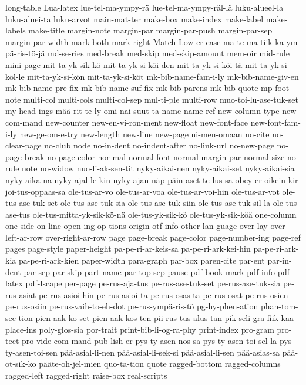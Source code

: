 {long-table
Lua-latex
lue-tel-ma-ympy-rä
lue-tel-ma-ympy-räl-lä
luku-alueel-la
luku-aluei-ta
luku-arvot
main-mat-ter
make-box
make-index
make-label
make-labels
make-title
margin-note
margin-par
margin-par-push
margin-par-sep
margin-par-width
mark-both
mark-right
Match-Low-er-case
ma-te-ma-tiik-ka-ym-pä-ris-tö-jä
md-se-ries
med-break
med-skip
med-skip-amount
mem-oir
mid-rule
mini-page
mit-ta-yk-sik-kö
mit-ta-yk-si-köi-den
mit-ta-yk-si-köi-tä
mit-ta-yk-si-köl-le
mit-ta-yk-si-kön
mit-ta-yk-si-köt
mk-bib-name-fam-i-ly
mk-bib-name-giv-en
mk-bib-name-pre-fix
mk-bib-name-suf-fix
mk-bib-parens
mk-bib-quote
mp-foot-note
multi-col
multi-cols
multi-col-sep
mul-ti-ple
multi-row
muo-toi-lu-ase-tuk-set
my-head-ings
mää-rit-te-ly-omi-nai-suut-ta
name
name-ref
new-column-type
new-com-mand
new-counter
new-en-vi-ron-ment
new-float
new-font-face
new-font-fam-i-ly
new-ge-om-e-try
new-length
new-line
new-page
ni-men-omaan
no-cite
no-clear-page
no-club
node
no-in-dent
no-indent-after
no-link-url
no-new-page
no-page-break
no-page-color
nor-mal
normal-font
normal-margin-par
normal-size
no-rule
note
no-widow
nuo-li-ak-sen-tit
nyky-aikai-nen
nyky-aikai-set
nyky-aikai-sia
nyky-aika-na
nyky-ajal-le-kin
nyky-ajan
näp-päin-aset-te-lus-sa
obey-cr
oikein-kir-joi-tus-oppaas-sa
ole-tus-ar-vo
ole-tus-ar-voa
ole-tus-ar-voi-hin
ole-tus-ar-vot
ole-tus-ase-tuk-set
ole-tus-ase-tuk-sia
ole-tus-ase-tuk-siin
ole-tus-ase-tuk-sil-la
ole-tus-ase-tus
ole-tus-mitta-yk-sik-kö-nä
ole-tus-yk-sik-kö
ole-tus-yk-sik-köä
one-column
one-side
on-line
open-ing
op-tions
origin
otf-info
other-lan-guage
over-lay
over-left-ar-row
over-right-ar-row
page
page-break
page-color
page-number-ing
page-ref
pages
page-style
paper-height
pa-pe-ri-ar-keis-sa
pa-pe-ri-ark-kei-hin
pa-pe-ri-ark-kia
pa-pe-ri-ark-kien
paper-width
para-graph
par-box
paren-cite
par-ent
par-in-dent
par-sep
par-skip
part-name
par-top-sep
pause
pdf-book-mark
pdf-info
pdf-latex
pdf-lscape
per-page
pe-rus-aja-tus
pe-rus-ase-tuk-set
pe-rus-ase-tuk-sia
pe-rus-asiat
pe-rus-asioi-hin
pe-rus-asioi-ta
pe-rus-osas-ta
pe-rus-osat
pe-rus-osien
pe-rus-osiin
pe-rus-vaih-to-eh-dot
pe-rus-ympä-ris-tö
pg-hy-phen-ation
phan-tom-sec-tion
pien-aak-ko-set
pien-aak-kos-ten
pii-rus-tus-alus-tan
pik-seli-gra-fiik-kaa
place-ins
poly-glos-sia
por-trait
print-bib-li-og-ra-phy
print-index
pro-gram
pro-tect
pro-vide-com-mand
pub-lish-er
pys-ty-asen-nos-sa
pys-ty-asen-toi-sel-la
pys-ty-asen-toi-sen
pää-asial-li-nen
pää-asial-li-sek-si
pää-asial-li-sen
pää-asias-sa
pää-ot-sik-ko
pääte-oh-jel-mien
quo-ta-tion
quote
ragged-bottom
ragged-columns
ragged-left
ragged-right
raise-box
real-scripts
}
